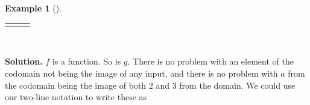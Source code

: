 \documentclass[10pt,]{book}
\theoremstyle{plain}
\theoremstyle{definition}
\theoremstyle{definition}
\newtheorem{example}[theorem]{Example}
\theoremstyle{definition}
\numberwithin{equation}{chapter}
\newlength{\panelmax}
\begin{document}
\begin{example}[]
{\setlength{\phBimage}{\ht\panelboxBimage+\dp\panelboxBimage}
\settototalheight{\phBimage}{\usebox{\panelboxBimage}}
\setlength{\panelmax}{\maxof{\panelmax}{\phBimage}}
\ifdefined\panelboxCimage\else\newsavebox{\panelboxCimage}\fi%
\begin{lrbox}{\panelboxCimage}
\end{lrbox}
\ifdefined\phCimage\else\newlength{\phCimage}\fi%
\setlength{\phCimage}{\ht\panelboxCimage+\dp\panelboxCimage}
\settototalheight{\phCimage}{\usebox{\panelboxCimage}}
\setlength{\panelmax}{\maxof{\panelmax}{\phCimage}}
\leavevmode%
\setlength{\tabcolsep}{0.0416666666666667\linewidth}
\par\medskip\noindent
\hspace*{0.0416666666666667\linewidth}%
\begin{tabular}{@{}*{3}{c}@{}}
\begin{minipage}[c][\panelmax][t]{0.25\linewidth}\usebox{\panelboxAimage}\end{minipage}&
\begin{minipage}[c][\panelmax][t]{0.25\linewidth}\usebox{\panelboxBimage}\end{minipage}&
\begin{minipage}[c][\panelmax][t]{0.25\linewidth}\usebox{\panelboxCimage}\end{minipage}\end{tabular}\\
}%
\par\smallskip%
\noindent\textbf{Solution.}\hypertarget{solution-249}{}\quad%
\hypertarget{p-2101}{}%
\(f\) is a function. So is \(g\). There is no problem with an element of the codomain not being the image of any input, and there is no problem with \(a\) from the codomain being the image of both 2 and 3 from the domain. We could use our two-line notation to write these as%
\begin{equation*}

\end{equation*}
\end{example}
\end{document}
